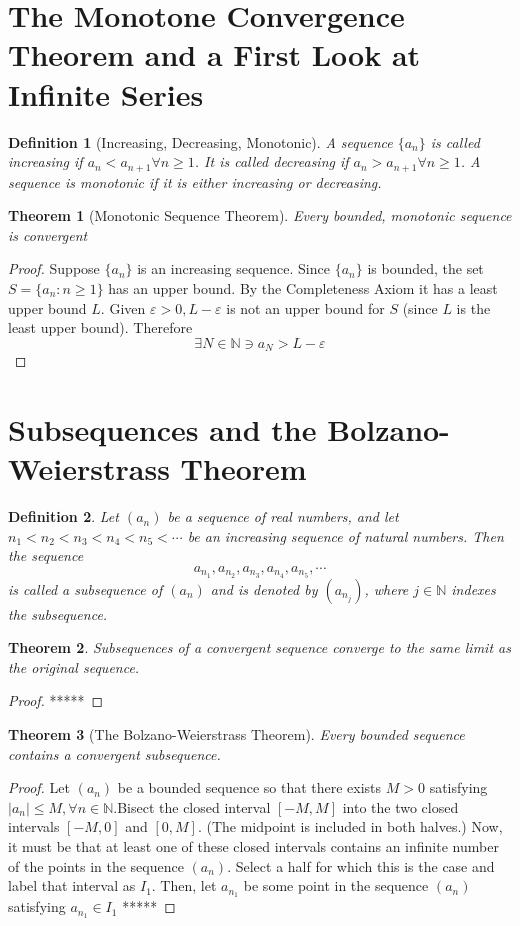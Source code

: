 \documentclass[10pt]{report}
\newtheorem{thm2}{Theorem}[section]
\newtheorem{def2}{Definition}[section]
\newcommand{\eps}{\varepsilon}
\begin{document}
\section{The Monotone Convergence Theorem and a First Look at Infinite Series}
\begin{def2}[Increasing, Decreasing, Monotonic]
A sequence $\{a_n\}$ is called increasing if $a_n < a_{n+1}\forall n\geq 1$. It is called decreasing if $a_n > a_{n+1}\forall n\geq 1$. A sequence is monotonic if it is either increasing or decreasing.
\end{def2}
\begin{thm2}[Monotonic Sequence Theorem]
Every bounded, monotonic sequence is convergent
\end{thm2}
\begin{proof}
Suppose $\{a_n\}$ is an increasing sequence. Since $\{a_n\}$ is bounded, the set $S=\{a_n:n\geq 1\}$ has an upper bound. By the Completeness Axiom it has a least upper bound $L$. Given $\eps>0, L-\eps$ is not an upper bound for $S$ (since $L$ is the least upper bound). Therefore
$$\exists N\in\mathbb{N}\ni a_N> L-\eps$$
\end{proof}

\section{Subsequences and the Bolzano-Weierstrass Theorem}
\begin{def2}
Let $(a_n)$ be a sequence of real numbers, and let $n_1<n_2<n_3<n_4<n_5<\cdots$ be an increasing sequence of natural numbers. Then the sequence
$$a_{n_1},a_{n_2},a_{n_3},a_{n_4},a_{n_5},\cdots$$
is called a subsequence of $(a_n)$ and is denoted by $(a_{n_j})$, where $j\in\mathbb{N}$ indexes the subsequence.
\end{def2}
\begin{thm2}
Subsequences of a convergent sequence converge to the same limit as the original sequence.
\end{thm2}
\begin{proof}
*****
\end{proof}
\begin{thm2}[The Bolzano-Weierstrass Theorem]
Every bounded sequence contains a convergent subsequence.
\end{thm2}
\begin{proof}
Let $(a_n)$ be a bounded sequence so that there exists $M>0$ satisfying $|a_n|\leq M, \forall n\in\mathbb{N}$.Bisect the closed interval $[-M,M]$ into the two closed intervals $[-M,0]$ and $[0,M]$. (The midpoint is included in both halves.) Now, it must be that at least one of these closed intervals contains an infinite number of the points in the sequence $(a_n)$. Select a half for which this is the case and label that interval as $I_1$. Then, let $a_{n_1}$ be some point in the sequence $(a_n)$ satisfying $a_{n_1}\in I_1$ *****
\end{proof}
\end{document}

